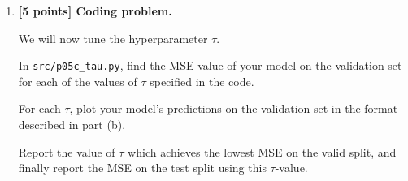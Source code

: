 \documentclass[10pt]{article}
\begin{document}
\begin{enumerate}
\begin{enumerate}[label=(\alph*)]
In \texttt{src/p05b\_lwr.py}, implement locally weighted linear
regression using the normal equations you derived in part (a), and
using
\[
w^{(i)}
=
\exp\left(
-
\frac{
\|x^{(i)}-x\|_2^2
}{
2\tau^2
}
\right).
\]

Train your model on the train split using
\[
\tau=0.5,
\]
then run your model on the valid split and report the mean squared
error (MSE).

Finally, plot your model's predictions on the validation set. Plot the
training set with blue \texttt{x} markers and the validation set with
red \texttt{o} markers.

Does the model seem to be under- or overfitting?


\item \textbf{[5 points] Coding problem.}

We will now tune the hyperparameter $\tau$.

In \texttt{src/p05c\_tau.py}, find the MSE value of your model on the
validation set for each of the values of $\tau$ specified in the code.

For each $\tau$, plot your model's predictions on the validation set
in the format described in part (b).

Report the value of $\tau$ which achieves the lowest MSE on the valid
split, and finally report the MSE on the test split using this
$\tau$-value.

\end{enumerate}

\end{enumerate}
\end{document}

